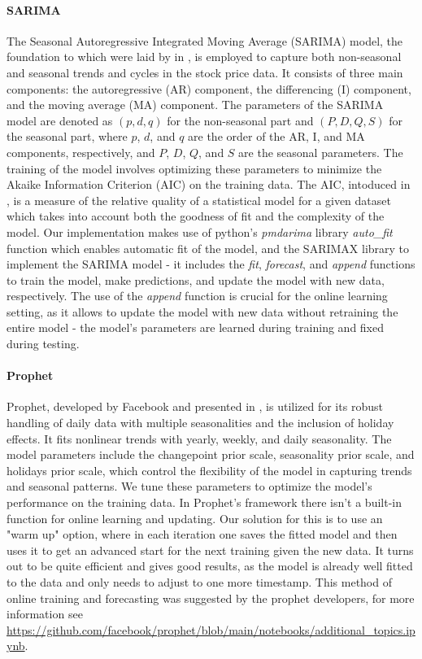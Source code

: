 \documentclass[12pt]{article}
\theoremstyle{definition}
\begin{document}
\paragraph{SARIMA}
The Seasonal Autoregressive Integrated Moving Average (SARIMA) model,
the foundation to which were laid by \citeauthor{box2015time} in \cite{box2015time},
is employed to capture both non-seasonal and seasonal trends and cycles in the stock price data. 
It consists of three main components: the autoregressive (AR) component, the differencing (I) component, and the moving average (MA) component.
The parameters of the SARIMA model are denoted as $(p, d, q)$ for the non-seasonal part and $(P, D, Q, S)$ for the seasonal part, where $p$, $d$, and $q$ are the order of the AR, I, and MA components, respectively, and $P$, $D$, $Q$, and $S$ are the seasonal parameters.
The training of the model involves optimizing these parameters to minimize the Akaike Information Criterion (AIC) on the training data. 
The AIC, intoduced in \cite{akaike1974new}, is a measure of the relative quality of a statistical model for a given dataset which 
takes into account both the goodness of fit and the complexity of the model.
Our implementation makes use of python's \textit{pmdarima} library \textit{auto\_fit} function which enables automatic fit of the model, and the SARIMAX library to implement the SARIMA model - it includes the \textit{fit}, \textit{forecast}, and \textit{append} functions to train the model, make predictions, and update the model with new data, respectively.
The use of the \textit{append} function is crucial for the online learning setting, as it allows to update the model with new data without retraining the entire model - the model's parameters are learned during training and fixed during testing.

\paragraph{Prophet}
Prophet, developed by Facebook and presented in \cite{taylor2018forecasting}, is utilized for its robust handling of daily data with multiple seasonalities and the inclusion of holiday effects. 
It fits nonlinear trends with yearly, weekly, and daily seasonality.
The model parameters include the changepoint prior scale, seasonality prior scale, and holidays prior scale, which control the flexibility of the model in capturing trends and seasonal patterns.
We tune these parameters to optimize the model's performance on the training data.
In Prophet's framework there isn't a built-in function for online learning and updating.
Our solution for this is to use an "warm up" option, where in each iteration one saves the fitted model and then uses it to get an advanced start for the next training given the new data.
It turns out to be quite efficient and gives good results, as the model is already well fitted to the data and only needs to adjust to one more timestamp.
This method of online training and forecasting was suggested by the prophet developers, for more information see \url{https://github.com/facebook/prophet/blob/main/notebooks/additional_topics.ipynb}.
\end{document}
